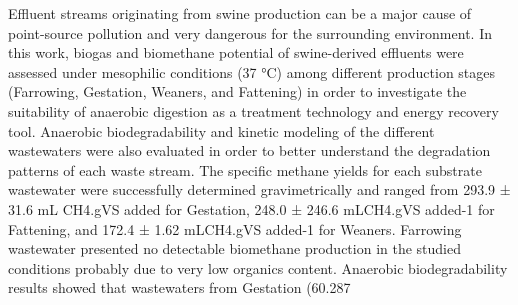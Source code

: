 Effluent streams originating from swine production can be a major cause of point-source pollution and very dangerous for the surrounding environment. In this work, biogas and biomethane potential of swine-derived effluents were assessed under mesophilic conditions (37 °C) among different production stages (Farrowing, Gestation, Weaners, and Fattening) in order to investigate the suitability of anaerobic digestion as a treatment technology and energy recovery tool. Anaerobic biodegradability and kinetic modeling of the different wastewaters were also evaluated in order to better understand the degradation patterns of each waste stream. The specific methane yields for each substrate wastewater were successfully determined gravimetrically and ranged from 293.9 ± 31.6 mL CH4.gVS added for Gestation, 248.0 ± 246.6 mLCH4.gVS added-1 for Fattening, and 172.4 ± 1.62 mLCH4.gVS added-1 for Weaners. Farrowing wastewater presented no detectable biomethane production in the studied conditions probably due to very low organics content.  Anaerobic biodegradability results showed that wastewaters from Gestation (60.287%